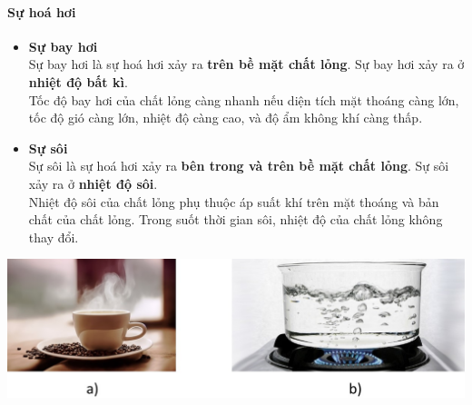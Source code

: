 \paragraph{Sự hoá hơi}
\begin{boxdn}
	\begin{itemize}
		\item \textbf{Sự bay hơi}\\
		Sự bay hơi là sự hoá hơi xảy ra \textbf{trên bề mặt chất lỏng}. Sự bay hơi xảy ra ở \textbf{nhiệt độ bất kì}.\\
		Tốc độ bay hơi của chất lỏng càng nhanh nếu diện tích mặt thoáng càng lớn, tốc độ gió càng lớn, nhiệt độ càng cao, và độ ẩm không khí càng thấp.
		\item \textbf{Sự sôi}\\
		Sự sôi là sự hoá hơi xảy ra \textbf{bên trong và trên bề mặt chất lỏng}. Sự sôi xảy ra ở \textbf{nhiệt độ sôi}.\\
		Nhiệt độ sôi của chất lỏng phụ thuộc áp suất khí trên mặt thoáng và bản chất của chất lỏng. Trong suốt thời gian sôi, nhiệt độ của chất lỏng không thay đổi.
	\end{itemize}
\end{boxdn}
\begin{center}
	
	\includegraphics[width=0.65\linewidth]{figs/VN12-Y24-PH-SYL-001-6}
\end{center}
